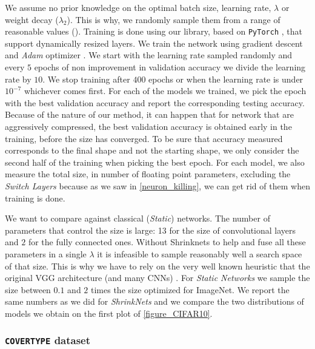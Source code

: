 We assume no prior knowledge on the optimal batch size, learning rate,
$\lambda$ or weight decay ($\lambda_2$). This is why, we randomly sample them
from a range of reasonable values ().
Training is done using our library, based on \texttt{PyTorch} \cite{paszke2017automatic}, that
support dynamically resized layers. We train the network using gradient descent
and \textit{Adam} optimizer \cite{DBLP:journals/corr/KingmaB14}. We start with
the learning rate sampled randomly and every $5$ epochs of non improvement in
validation accuracy we divide the learning rate by $10$. We stop training after
$400$ epochs or when the learning rate is under $10^{-7}$ whichever comes
first.  For each of the models we trained, we pick the epoch with the best
validation accuracy and report the corresponding testing accuracy. Because of
the nature of our method, it can happen that for network that are aggressively
compressed, the best validation accuracy is obtained early in the training,
before the size has converged. To be sure that accuracy measured corresponds to
the final shape and not the starting shape, we only consider the second half of
the training when picking the best epoch. For each model, we also measure the
total size, in number of floating point parameters, excluding the
\textit{Switch Layers} because as we saw in \cref{neuron_killing}, we can
get rid of them when training is done.

We want to compare against classical (\textit{Static}) networks. The number of
parameters that control the size is large: 13 for the size of convolutional
layers and $2$ for the fully connected ones. Without Shrinknets to help and fuse
all these parameters in a single $\lambda$ it is infeasible to sample reasonably
well a search space of that size. This is why we have to rely on the very well
known heuristic that the original VGG architecture (and many CNNs) . For \textit{Static Networks}
we sample the size between $0.1$ and $2$ times the size optimized for ImageNet.
We report the same numbers as we did for \textit{ShrinkNets} and we compare the
two distributions of models we obtain on the first plot of \cref{figure_CIFAR10}.


\subsubsection{\texttt{COVERTYPE} dataset}

